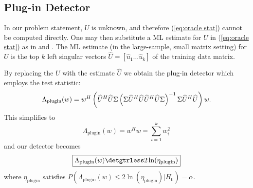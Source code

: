 
\subsection{Plug-in Detector}

In our problem statement, $U$ is unknown, and therefore (\ref{eq:oracle stat}) cannot be computed directly. One may then substitute a ML estimate for $U$ in (\ref{eq:oracle stat}) as in \cite{jin2005cfar} and \cite{mcwhorter2003matched}. The ML estimate (in the large-sample, small matrix setting) for $U$ is the top $k$ left singular vectors $\widehat{U}=[\widehat{u}_1 \dots \widehat{u}_{k}]$ of the training data matrix. 

By replacing the $U$ with the estimate $\widehat{U}$ we obtain the plug-in detector which employs the test statistic: 
\begin{equation*}
\Lambda_{\text{plugin}}(w)= w^H\left(\widehat{U}^H\widehat{U}\Sigma\left(\Sigma\widehat{U}^H\widehat{U}\widehat{U}^H\widehat{U}\Sigma\right)^{-1}\Sigma\widehat{U}^H\widehat{U}\right)w.\\
\end{equation*}
This simplifies to
\begin{equation}\label{eq:plugin stat}
\boxed{\Lambda_{\text{plugin}}(w) = w^Hw=\sum_{i=1}^kw_i^2}
\end{equation}
and our detector becomes
\begin{equation}\label{eq:plugin classifier}
\boxed{\Lambda_{\text{plugin}}(w) \detgtrless 2\ln(\eta_{\text{plugin}})}
\end{equation}
where $\eta_{\text{plugin}}$ satisfies $P(\Lambda_{\text{plugin}}(w)\leq2\ln\left(\eta_{\text{plugin}}\right)|H_0)=\alpha$.

